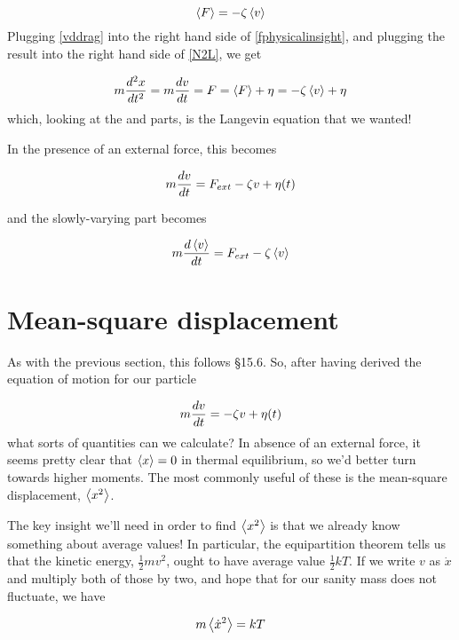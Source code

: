 \documentclass[12pt]{article}
\begin{document}
\begin{equation}
  \label{vddrag}
  \left< F\right> = -\zeta \left< v\right>
\end{equation}
Plugging \ref{vddrag} into the right hand side of
\ref{fphysicalinsight}, and plugging the result into the right hand
side of \ref{N2L}, we get

\begin{equation*}
  m\frac{d^2 x}{d t^2} = m\frac{d v}{d t} = F = \left< F\right> + \eta = -\zeta \left< v\right> + \eta
\end{equation*}
which, looking at the  and  parts, is the Langevin
equation that we wanted!

In the presence of an external force, this becomes

\begin{equation}
  m\frac{d v}{d t} = F_{ext} -\zeta v + \eta(t)
\end{equation}

and the slowly-varying part becomes

\begin{equation}
  m\frac{d \left< v\right>}{d t} = F_{ext} -\zeta \left< v\right>
\end{equation}
\section{Mean-square displacement}

As with the previous section, this follows \cite{ReifStatMech}
\S15.6. 
So, after having derived the equation of motion for our
particle 

\begin{equation*}
  m\frac{d v}{d t} = -\zeta v + \eta(t)
\end{equation*}
what sorts of quantities can we calculate? In absence of an external
force, it seems pretty clear that $\left< x\right> = 0$ in thermal
equilibrium, so
we'd better turn towards higher moments. The most commonly useful of
these is the mean-square displacement, $\left< x^2\right>$.

The key insight we'll need in order to find $\left< x^2\right>$ is that we
already know something about average values! In particular, the
equipartition theorem tells us that the kinetic energy,
$\frac{1}{2}mv^2$, ought to have average value $\frac{1}{2} kT$. If we
write $v$ as $\dot{x}$ and multiply both of those by two, and hope
that for our sanity mass does not fluctuate, we have

\begin{equation}
  \label{equipartition}
  m\left< \dot{x}^2\right> = kT
\end{equation}
\end{document}

